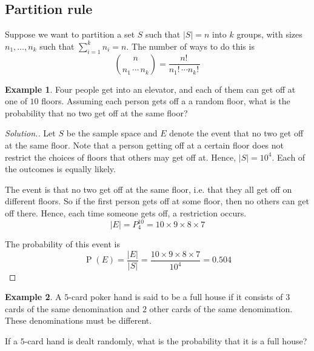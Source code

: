 \documentclass[11pt,letterpaper]{article}
\makeatletter
\theoremstyle{definition}
\newtheorem{eg}{Example}
\theoremstyle{remark}
\newenvironment{solution}{
    \let\oldqedsymbol=\qedsymbol%
    \def\@addpunct##1{}%
    \renewcommand{\qedsymbol}{$\blacktriangleleft$}%
    \begin{proof}[\textit Solution.]
}{
    \end{proof}%
    \renewcommand{\qedsymbol}{\oldqedsymbol}
}
\newcommand{\parens}[1]{\left(#1\right)}
\newcommand{\fact}{!\,}
\DeclareMathOperator{\Prob}{P}
\renewcommand{\P}[1]{\Prob{\parens{#1}}}
\makeatother
\begin{document}
\subsection{Partition rule}
\label{sec:partition-rule}

Suppose we want to partition a set $S$ such that $|S| = n$ into $k$ groups,
with sizes $n_1, \ldots, n_k$ such that $\sum_{i=1}^k n_i = n$. The number of
ways to do this is
\begin{equation}
    \label{eq:partition-rule}
    {n \choose n_1 \, \cdots \, n_k}
    = \frac{n\fact}{n_1\fact \cdots n_k\fact}
\end{equation}

\begin{eg}
    Four people get into an elevator, and each of them can get off at one of
    $10$ floors. Assuming each person gets off a a random floor, what is the
    probability that no two get off at the same floor?
\end{eg}

\begin{solution}
    Let $S$ be the sample space and $E$ denote the event that no two get off at
    the same floor. Note that a person getting off at a certain floor does not
    restrict the choices of floors that others may get off at.
    Hence, $|S| = 10^4$. Each of the outcomes is equally likely.

    The event is that no two get off at the same floor, i.e. that they all get
    off on different floors. So if the first person gets off at some floor,
    then no others can get off there. Hence, each time someone gets off, a
    restriction occurs.
    \begin{equation*}
        |E| = P_4^{10} = 10 \times 9 \times 8 \times 7
    \end{equation*}

    The probability of this event is
    \begin{equation*}
        \P{E}
        = \frac{|E|}{|S|} = \frac{10 \times 9 \times 8 \times 7}{10^4}
        = 0.504
    \end{equation*}
\end{solution}

\begin{eg}
    A $5$-card poker hand is said to be a full house if it consists of $3$
    cards of the same denomination and $2$ other cards of the same
    denomination. These denominations must be different.

    If a $5$-card hand is dealt randomly, what is the probability that it is a
    full house?
\end{eg}
\end{document}
